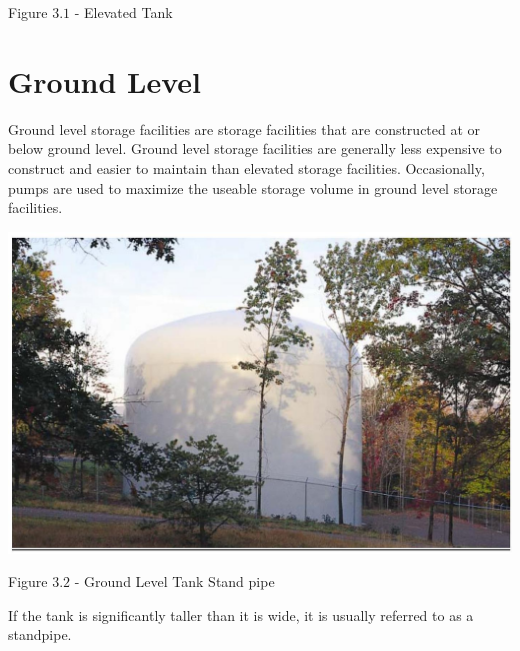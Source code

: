 \documentclass[10pt]{article}
\begin{document}
Figure $3.1$ - Elevated Tank

\section{Ground Level}
Ground level storage facilities are storage facilities that are constructed at or below ground level. Ground level storage facilities are generally less expensive to construct and easier to maintain than elevated storage facilities. Occasionally, pumps are used to maximize the useable storage volume in ground level storage facilities.

\includegraphics[max width=\textwidth]{GroundLevelTank}

Figure $3.2$ - Ground Level Tank Stand pipe

If the tank is significantly taller than it is wide, it is usually referred to as a standpipe.
\end{document}
